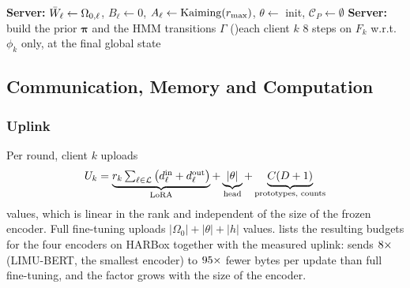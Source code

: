 \begin{algorithm}[!t]
\caption{\method{} training}
\label{alg:fedpeft}
\footnotesize
{}
\textbf{Server:} $\bar{W}_\ell\gets\Omega_{0,\ell}$, $B_\ell\gets0$, $A_\ell\gets\mathrm{Kaiming}(r_{\max})$, $\theta\gets$ init, $\mathcal{C}_P\gets\emptyset$\;
\textbf{Server:} build the prior $\boldsymbol{\pi}$ and the HMM transitions $\Gamma$\;
\For(){each client $k$}{
  $8$ steps on $F_k$ w.r.t.\ $\phi_k$ only, at the final global state\;
}
\end{algorithm}

\subsection{Communication, Memory and Computation}\label{sec:method:cost}

\subsubsection{Uplink}
Per round, client $k$ uploads
\begin{equation}\label{eq:uplink}
  U_k=\underbrace{r_k\textstyle\sum_{\ell\in\mathcal{L}}\big(d^{\mathrm{in}}_\ell+d^{\mathrm{out}}_\ell\big)}_{\text{LoRA}}
  +\underbrace{|\theta|}_{\text{head}}+\underbrace{C(D+1)}_{\text{prototypes, counts}}
\end{equation}
values, which is linear in the rank and independent of the size of the frozen encoder. Full
fine-tuning uploads $|\Omega_0|+|\theta|+|h|$ values.  lists the resulting budgets
for the four encoders on HARBox together with the measured uplink: \method{} sends
$8\times$ (LIMU-BERT, the smallest encoder) to $95\times$ fewer bytes per
update than full fine-tuning, and the factor grows with the size of the encoder.

